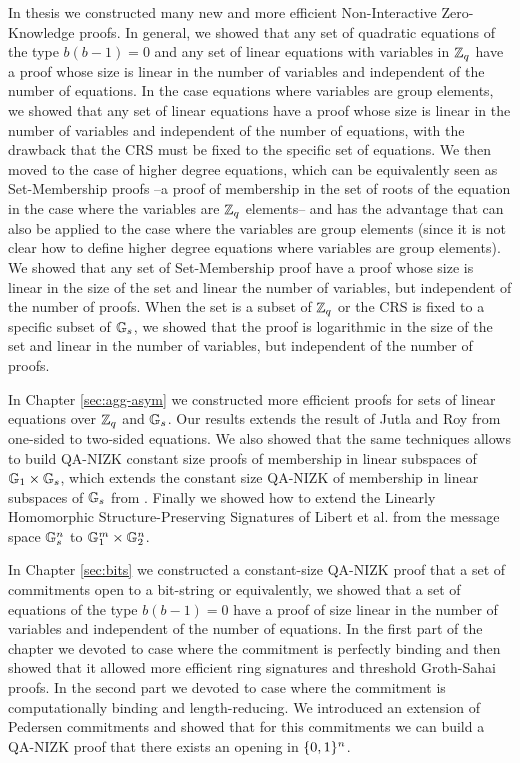 In thesis we constructed many new and more efficient Non-Interactive Zero-Knowledge proofs. In general, we showed that any set of quadratic equations of the type $b(b-1)=0$ and any set of linear equations with variables in $\mathbb{Z}_q$ have a proof whose size is linear in the number of variables and independent of the number of equations. In the case equations where variables are group elements, we showed that any set of linear equations have a proof whose size is linear in the number of variables and independent of the number of equations, with the drawback that the CRS must be fixed to the specific set of equations. We then moved to the case of higher degree equations, which can be equivalently seen as Set-Membership proofs --a proof of membership in the set of roots of the equation in the case where the variables are $\mathbb{Z}_q$ elements-- and has the advantage that can also be applied to the case where the variables are group elements (since it is not clear how to define higher degree equations where variables are group elements). We showed that any set of Set-Membership proof have a proof whose size is linear in the size of the set and linear the number of variables, but independent of the number of proofs. When the set is a subset of $\mathbb{Z}_q$ or the CRS is fixed to a specific subset of $\mathbb{G}_s$, we showed that the proof is logarithmic in the size of the set and linear in the number of variables, but independent of the number of proofs.

In Chapter \ref{sec:agg-asym} we constructed more efficient proofs for sets of linear equations over $\mathbb{Z}_q$ and $\mathbb{G}_s$. Our results extends the result of Jutla and Roy \cite{C:JutRoy14} from one-sided to two-sided equations. We also showed that the same techniques allows to build QA-NIZK constant size proofs of membership in linear subspaces of $\mathbb{G}_1\times\mathbb{G}_s$, which extends the constant size QA-NIZK of membership in linear subspaces of $\mathbb{G}_s$ from \cite{EC:LPJY14,C:JutRoy14,EC:KilWee15,EC:AbdBenPoi15}. Finally we showed how to extend the Linearly Homomorphic Structure-Preserving Signatures of Libert et al. \cite{EC:LPJY14} from the message space $\mathbb{G}_s^n$ to $\mathbb{G}_1^m\times\mathbb{G}_2^n$.

In Chapter \ref{sec:bits} we constructed a constant-size QA-NIZK proof that a set of commitments open to a bit-string or equivalently, we showed that a set of equations of the type $b(b-1)=0$ have a proof of size linear in the number of variables and independent of the number of equations. In the first part of the chapter we devoted to case where the commitment is perfectly binding and then showed that it allowed more efficient ring signatures and threshold Groth-Sahai proofs. In the second part we devoted to case where the commitment is computationally binding and length-reducing. We introduced an extension of Pedersen commitments and showed that for this commitments we can build a QA-NIZK proof that there exists an opening in $\{0,1\}^n$.

